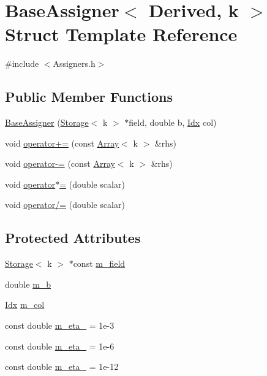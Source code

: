 \hypertarget{structBaseAssigner}{}\section{Base\+Assigner$<$ Derived, k $>$ Struct Template Reference}
\label{structBaseAssigner}


{\ttfamily \#include $<$Assigners.\+h$>$}

\subsection*{Public Member Functions}
\begin{DoxyCompactItemize}
\item 
\hyperlink{structBaseAssigner_a8ad7e768d4b810deb88a0411de5dd985}{Base\+Assigner} (\hyperlink{Includes_8h_ae7d375db701e28425a3faea2827f134b}{Storage}$<$ k $>$ $\ast$field, double b, \hyperlink{Includes_8h_ae78891cd308078a2f5f9e7193065c805}{Idx} col)
\item 
void \hyperlink{structBaseAssigner_a52971385a3a0e57e69e3cee3f7ad558a}{operator+=} (const \hyperlink{Includes_8h_abd9de33944f934950000c3929e14ad8d}{Array}$<$ k $>$ \&rhs)
\item 
void \hyperlink{structBaseAssigner_ac0129fea47a3cb94d72abb0461445dfe}{operator-\/=} (const \hyperlink{Includes_8h_abd9de33944f934950000c3929e14ad8d}{Array}$<$ k $>$ \&rhs)
\item 
void \hyperlink{structBaseAssigner_a2c2f28fd070798b3355b246add7385cc}{operator$\ast$=} (double scalar)
\item 
void \hyperlink{structBaseAssigner_a3a85001691ad53ebf55de7de7d823b14}{operator/=} (double scalar)
\end{DoxyCompactItemize}
\subsection*{Protected Attributes}
\begin{DoxyCompactItemize}
\item 
\hyperlink{Includes_8h_ae7d375db701e28425a3faea2827f134b}{Storage}$<$ k $>$ $\ast$const \hyperlink{structBaseAssigner_a60cf41e192c4dd0b8799a9e6a8d82a92}{m\+\_\+field}
\item 
double \hyperlink{structBaseAssigner_abb635ee3585045c12214aa0fe4fdfcde}{m\+\_\+b}
\item 
\hyperlink{Includes_8h_ae78891cd308078a2f5f9e7193065c805}{Idx} \hyperlink{structBaseAssigner_af1bd9c6e8db4988669a206aa9df728c4}{m\+\_\+col}
\item 
const double \hyperlink{structBaseAssigner_a1d05f826efcd07f991209745cdfd496c}{m\+\_\+eta\+\_} = 1e-\/3
\item 
const double \hyperlink{structBaseAssigner_a407b3f5cf370a0f1bc56e7289390c8f3}{m\+\_\+eta\+\_} = 1e-\/6
\item 
const double \hyperlink{structBaseAssigner_a6c0c09e9cf388113827c2571b4d3d44d}{m\+\_\+eta\+\_} = 1e-\/12
\end{DoxyCompactItemize}
